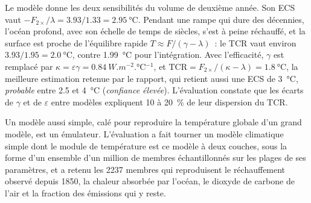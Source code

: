 \begin{omfigure}
\par{}\label{fig:b3:climate-models:two-layer}
\end{omfigure}

Le modèle donne les deux sensibilités du volume de deuxième année. Son ECS vaut
$-F_{2\times}/\lambda = 3.93/1.33 = \qty{2.95}{\celsius}$. Pendant une rampe
qui dure des décennies, l'océan profond, avec son échelle de temps de siècles, s'est à peine
réchauffé, et la surface est proche de l'équilibre rapide $T \approx F/(\gamma -
\lambda)$~: le TCR vaut environ $3.93/1.95 = \qty{2.0}{\celsius}$, contre
\qty{1.99}{\celsius} pour l'intégration. Avec l'efficacité, $\gamma$ est
remplacé par $\kappa = \varepsilon\gamma = \qty{0.84}{W.m^{-2}.\celsius^{-1}}$,
et $\text{TCR} = F_{2\times}/(\kappa - \lambda) = \qty{1.8}{\celsius}$,
la meilleure estimation retenue par le rapport, qui retient aussi une ECS de
\qty{3}{\celsius}, \emph{probable} entre 2.5 et \qty{4}{\celsius} (\emph{confiance
élevée}). L'évaluation constate que les écarts de $\gamma$ et
de $\varepsilon$ entre modèles expliquent 10 à \qty{20}{\percent} de leur
dispersion du TCR.

Un modèle aussi simple, calé pour reproduire la température globale d'un grand
modèle, est un émulateur. L'évaluation a fait tourner un modèle climatique simple dont le module de température est
ce modèle à deux couches, sous la forme d'un ensemble d'un million de membres échantillonnés sur les
plages de ses paramètres, et a retenu les 2237 membres qui reproduisent le
réchauffement observé depuis 1850, la chaleur absorbée par l'océan, le
dioxyde de carbone de l'air et la fraction des émissions qui y reste.

